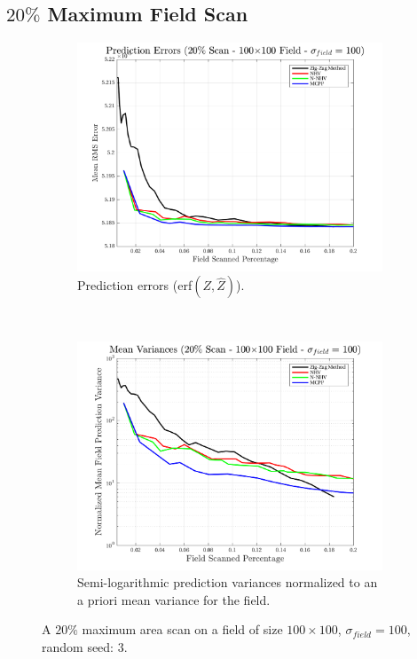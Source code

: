 \FloatBarrier
\clearpage
\subsection{$20\%$ Maximum Field Scan}
\begin{figure}[htb!]
    \centering
    \begin{subfigure}[t]{0.65\textwidth}
        \centering
        \includegraphics[width=\linewidth]{figures/hbresults/pred_errs_20p_100x100_sf_100_seed_3.png}
        \captionsetup{skip=0.20\baselineskip,size=footnotesize}
        \caption{Prediction errors (erf$(Z,\hat{Z})$).}
        \label{fig:prederrs_sigma100_p20_s3}
    \end{subfigure}%
    \\
    \begin{subfigure}[t]{0.65\textwidth}
        \centering
        \includegraphics[width=\linewidth]{figures/hbresults/vars_20p_100x100_sf_100_seed_3.png}
        \captionsetup{skip=0.20\baselineskip,size=footnotesize}
        \caption{Semi-logarithmic prediction variances normalized to an a priori mean variance for the field.}
        \label{fig:prederrs_sigma100_p20_s3}
    \end{subfigure}
    \captionsetup{skip=0.20\baselineskip}
    \caption{A $20\%$ maximum area scan on a field of size $100 \times 100$, $\sigma_{field} = 100$, random seed: 3.}
    \label{fig:sigma100_p20_s3}
\end{figure}

